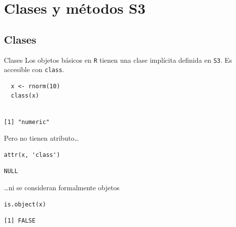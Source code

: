 \documentclass[xcolor={usenames,svgnames,dvipsnames}]{beamer}
\begin{document}
\section{Clases y métodos S3}
\label{sec:orgf2d7ccb}

\subsection{Clases}
\label{sec:org6e39eb6}
\begin{frame}[label={sec:orgd8a0169},fragile]{Clases}
 Los objetos básicos en \texttt{R} tienen una clase implícita definida en \texttt{S3}. Es accesible con \texttt{class}.
\lstset{language=r,label= ,caption= ,captionpos=b,numbers=none}
\begin{lstlisting}
  x <- rnorm(10)
  class(x)
\end{lstlisting}

\begin{verbatim}

[1] "numeric"
\end{verbatim}


Pero no tienen atributo\ldots{}
\lstset{language=r,label= ,caption= ,captionpos=b,numbers=none}
\begin{lstlisting}
attr(x, 'class')
\end{lstlisting}

\begin{verbatim}
NULL
\end{verbatim}


\ldots{}ni se consideran formalmente objetos
\lstset{language=r,label= ,caption= ,captionpos=b,numbers=none}
\begin{lstlisting}
is.object(x)
\end{lstlisting}

\begin{verbatim}
[1] FALSE
\end{verbatim}
\end{frame}
\end{document}
